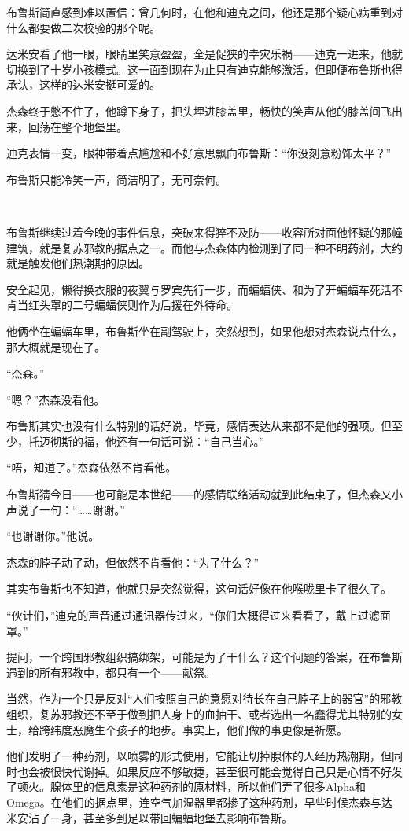 \documentclass[../main]{subfiles}
\begin{document}
布鲁斯简直感到难以置信：曾几何时，在他和迪克之间，他还是那个疑心病重到对什么都要做二次校验的那个呢。

达米安看了他一眼，眼睛里笑意盈盈，全是促狭的幸灾乐祸——迪克一进来，他就切换到了十岁小孩模式。这一面到现在为止只有迪克能够激活，但即便布鲁斯也得承认，这样的达米安挺可爱的。

杰森终于憋不住了，他蹲下身子，把头埋进膝盖里，畅快的笑声从他的膝盖间飞出来，回荡在整个地堡里。

迪克表情一变，眼神带着点尴尬和不好意思飘向布鲁斯：“你没刻意粉饰太平？”

布鲁斯只能冷笑一声，简洁明了，无可奈何。

~\

布鲁斯继续过着今晚的事件信息，突破来得猝不及防——收容所对面他怀疑的那幢建筑，就是复苏邪教的据点之一。而他与杰森体内检测到了同一种不明药剂，大约就是触发他们热潮期的原因。

安全起见，懒得换衣服的夜翼与罗宾先行一步，而蝙蝠侠、和为了开蝙蝠车死活不肯当红头罩的二号蝙蝠侠则作为后援在外待命。

他俩坐在蝙蝠车里，布鲁斯坐在副驾驶上，突然想到，如果他想对杰森说点什么，那大概就是现在了。

“杰森。”

“嗯？”杰森没看他。

布鲁斯其实也没有什么特别的话好说，毕竟，感情表达从来都不是他的强项。但至少，托迈彻斯的福，他还有一句话可说：“自己当心。”

“唔，知道了。”杰森依然不肯看他。

布鲁斯猜今日——也可能是本世纪——的感情联络活动就到此结束了，但杰森又小声说了一句：“……谢谢。”

“也谢谢你。”他说。

杰森的脖子动了动，但依然不肯看他：“为了什么？”

其实布鲁斯也不知道，他就只是突然觉得，这句话好像在他喉咙里卡了很久了。

“伙计们，”迪克的声音通过通讯器传过来，“你们大概得过来看看了，戴上过滤面罩。”

提问，一个跨国邪教组织搞绑架，可能是为了干什么？这个问题的答案，在布鲁斯遇到的所有邪教中，都只有一个——献祭。

当然，作为一个只是反对“人们按照自己的意愿对待长在自己脖子上的器官”的邪教组织，复苏邪教还不至于做到把人身上的血抽干、或者选出一名蠢得尤其特别的女士，给跨纬度恶魔生个孩子的地步。事实上，他们做的事更像是祈愿。

他们发明了一种药剂，以喷雾的形式使用，它能让切掉腺体的人经历热潮期，但同时也会被很快代谢掉。如果反应不够敏捷，甚至很可能会觉得自己只是心情不好发了顿火。腺体里的信息素是这种药剂的原材料，所以他们弄了很多Alpha和Omega。在他们的据点里，连空气加湿器里都掺了这种药剂，早些时候杰森与达米安沾了一身，甚至多到足以带回蝙蝠地堡去影响布鲁斯。
\end{document}
